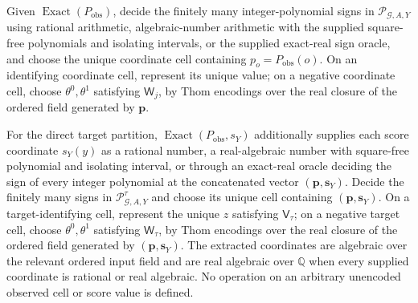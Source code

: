 Given \(\operatorname{Exact}(P_{\mathrm{obs}})\), decide the finitely many integer-polynomial signs in \(\mathscr P_{\mathcal G,A,Y}\) using rational arithmetic, algebraic-number arithmetic with the supplied square-free polynomials and isolating intervals, or the supplied exact-real sign oracle, and choose the unique coordinate cell containing \(p_o=P_{\mathrm{obs}}(o)\). On an identifying coordinate cell, represent its unique value; on a negative coordinate cell, choose \(\theta^0,\theta^1\) satisfying \(\mathsf W_j\), by Thom encodings over the real closure of the ordered field generated by \(\mathbf p\).

For the direct target partition, \(\operatorname{Exact}(P_{\mathrm{obs}},s_Y)\) additionally supplies each score coordinate \(s_Y(y)\) as a rational number, a real-algebraic number with square-free polynomial and isolating interval, or through an exact-real oracle deciding the sign of every integer polynomial at the concatenated vector \((\mathbf p,\mathbf s_Y)\). Decide the finitely many signs in \(\mathscr P^{\tau}_{\mathcal G,A,Y}\) and choose its unique cell containing \((\mathbf p,\mathbf s_Y)\). On a target-identifying cell, represent the unique \(z\) satisfying \(\mathsf V_{\tau}\); on a negative target cell, choose \(\theta^0,\theta^1\) satisfying \(\mathsf W_{\tau}\), by Thom encodings over the real closure of the ordered field generated by \((\mathbf p,\mathbf s_Y)\). The extracted coordinates are algebraic over the relevant ordered input field and are real algebraic over \(\mathbb Q\) when every supplied coordinate is rational or real algebraic. No operation on an arbitrary unencoded observed cell or score value is defined.